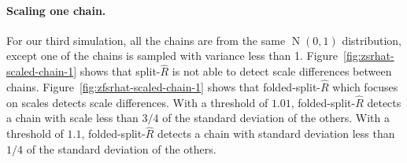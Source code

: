 \documentclass[american,]{article}
\let\oldparagraph\paragraph
\renewcommand{\paragraph}[1]{\oldparagraph{#1}\mbox{}}
\DeclareMathOperator{\N}{N}
\begin{document}
\hypertarget{scaling-one-chain}{%
\paragraph{Scaling one chain.}\label{scaling-one-chain}}
For our third simulation, all the chains are from the same $\N(0, 1)$ distribution,
except one of the chains is sampled with variance less than 1.
Figure~\ref{fig:zsrhat-scaled-chain-1} shows that
split-\(\widehat{R}\) is not able to detect scale differences between
chains.
%
Figure~\ref{fig:zfsrhat-scaled-chain-1} shows that
folded-split-\(\widehat{R}\) which focuses on scales detects scale
differences. With a threshold of \(1.01\),
folded-split-\(\widehat{R}\) detects a chain with scale less than
\(3/4\) of the standard deviation of the others. With a threshold of
\(1.1\), folded-split-\(\widehat{R}\) detects a chain with standard
deviation less than \(1/4\) of the standard deviation of the others.
\end{document}
